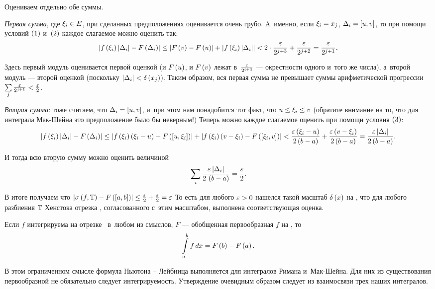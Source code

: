 \documentclass[draft]{article}
\begin{document}
\smallskip

Оцениваем отдельно обе суммы.

\smallskip

{\sl Первая сумма}, где $\xi_i \in E$, при сделанных предположениях
оценивается очень грубо. A~именно, если $\xi_i = x_j$,
$\dei = \seg[u,v]$, то при помощи условий $\at(1)$ и~$\at(2)$
каждое слагаемое можно оценить так:
$$\abs{\fxildi-F\at(\dei)}\le\abs{F\at(v)-F\at(u)}+\abs\fxildi<
2\cdot{\ep\over2^{j+3}}+{\ep\over2^{j+2}}={\ep\over2^{j+1}}.$$

Здесь первый модуль оценивается первой оценкой (и $F\at(u)$, и
$F\at(v)$ лежат в~$\varepsilon\over2^{i+3}$ --- окрестности одного и~того же
числа), а~второй модуль --- второй оценкой (поскольку
$\ldei<\de\at(x_j)$). Таким образом, вся первая сумма не превышает
суммы арифметической прогрессии
$\sum\limits_j{\varepsilon\over2^{j+1}}<{\varepsilon\over2}$.

\eject

{\sl Вторая сумма}: тоже считаем, что $\dei=\seg[u,v]$, и~при этом
нам понадобится тот факт, что $u\le\xi_i\le v$ (обратите внимание на
то, что для интеграла Мак-Шейна это предположение было бы неверным!)
Теперь можно каждое слагаемое оценить при помощи условия $\at(3)$:
$$\abs{\fxildi-F\at(\dei)}\le \abs{f\at(\xii)\at(\xii-u)-F\at(\seg[u,\xii])}+
\abs{f\at(\xii)\at(v-\xii)-F\at(\seg[\xii,v])}
<{\ep\at(\xii-u)\over2\at(b-a)}+{\ep\at(v-\xii)\over
2\at(b-a)}={\ep\ldei\over2\at(b-a)}.$$

И тогда всю вторую сумму можно оценить величиной
$$\sumi{\ep\ldei\over2\,\at(b-a)}={\ep\over2}.$$

В итоге получаем что
$\abs{\isfT-F\at(\segab)}\le{\ep\over2}+{\ep\over2}=\ep$ То есть для
любого $\varepsilon > 0$ нашелся такой масштаб $\dex$ на \ab, что для любого
разбиения $\mathbb{T}$ Хенстока отрезка \ab, согласованного с~этим
масштабом, выполнена соответствующая оценка.

\prtm

\bigskip


Если $f$ интегрируема на отрезке \ab\ в~любом из смыслов, $F$ ---
обобщенная первообразная $f$ на \ab, то
$$\intabfdx=F\at(b)-F\at(a).$$

В этом ограниченном смысле формула Ньютона -- Лейбница выполняется
для интегралов Римана и~Мак-Шейна. Для них из существования
первообразной не обязательно следует интегрируемость. Утверждение
очевидным образом следует из взаимосвязи трех наших интегралов.

\bigskip
\end{document}
